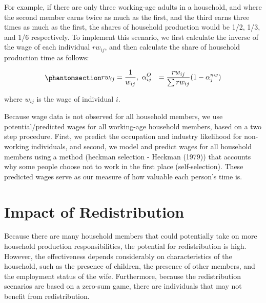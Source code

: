 \documentclass[
  11pt,
]{article}
\begin{document}
For example, if there are only three working-age adults in a household,
and where the second member earns twice as much as the first, and the
third earns three times as much as the first, the shares of household
production would be 1/2, 1/3, and 1/6 respectively. To implement this
scenario, we first calculate the inverse of the wage of each individual
\(rw_{ij}\), and then calculate the share of household production time
as follows:

\begin{equation}\phantomsection\label{eq-r3}{\begin{aligned}
rw_{ij} &= \frac{1}{w_{ij}}, \ 
\alpha_{ij}^O &= \frac{rw_{ij}}{\sum rw_{ij}} (1-\alpha_{j}^{nw})
\end{aligned}
}\end{equation}

where \(w_{ij}\) is the wage of individual \(i\).

Because wage data is not observed for all household members, we use
potential/predicted wages for all working-age household members, based
on a two step procedure. First, we predict the occupation and industry
likelihood for non-working individuals, and second, we model and predict
wages for all household members using a method (heckman selection -
Heckman (1979)) that accounts why some people choose not to work in the
first place (self-selection). These predicted wages serve as our measure
of how valuable each person's time is.

\section{Impact of Redistribution}\label{impact-of-redistribution}

Because there are many household members that could potentially take on
more household production responsibilities, the potential for
redistribution is high. However, the effectiveness depends considerably
on characteristics of the household, such as the presence of children,
the presence of other members, and the employment status of the wife.
Furthermore, because the redistribution scenarios are based on a
zero-sum game, there are individuals that may not benefit from
redistribution.
\end{document}
